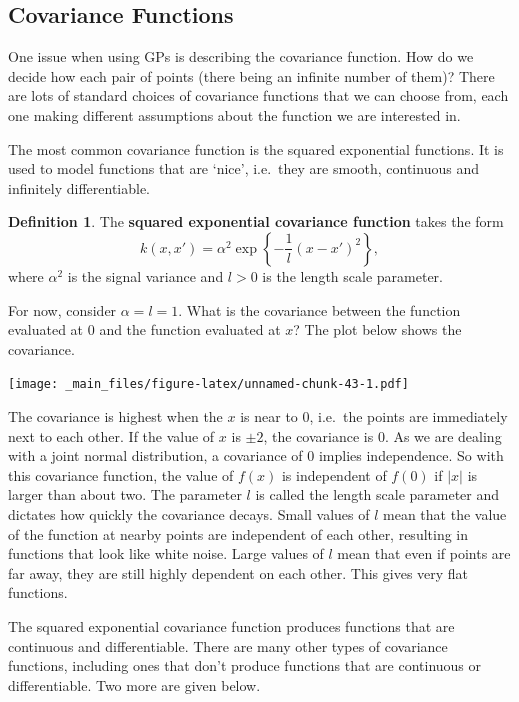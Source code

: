 \documentclass[
]{book}
\theoremstyle{definition}
\newtheorem{definition}{Definition}[chapter]
\theoremstyle{definition}
\theoremstyle{definition}
\theoremstyle{definition}
\theoremstyle{remark}
\begin{document}
\hypertarget{covariance-functions}{%
\subsection{Covariance Functions}\label{covariance-functions}}

One issue when using GPs is describing the covariance function. How do we decide how each pair of points (there being an infinite number of them)? There are lots of standard choices of covariance functions that we can choose from, each one making different assumptions about the function we are interested in.

The most common covariance function is the squared exponential functions. It is used to model functions that are `nice', i.e.~they are smooth, continuous and infinitely differentiable.

\begin{definition}
The \textbf{squared exponential covariance function} takes the form
\[
k(x, x') = \alpha^2\exp\left\{-\frac{1}{l}(x-x')^2\right\},
\]
where \(\alpha^2\) is the signal variance and \(l>0\) is the length scale parameter.
\end{definition}

For now, consider \(\alpha = l = 1\). What is the covariance between the function evaluated at 0 and the function evaluated at \(x\)? The plot below shows the covariance.

\texttt{[image: \_main\_files/figure-latex/unnamed-chunk-43-1.pdf]}

The covariance is highest when the \(x\) is near to 0, i.e.~the points are immediately next to each other. If the value of \(x\) is \(\pm 2\), the covariance is 0. As we are dealing with a joint normal distribution, a covariance of 0 implies independence. So with this covariance function, the value of \(f(x)\) is independent of \(f(0)\) if \(|x|\) is larger than about two. The parameter \(l\) is called the length scale parameter and dictates how quickly the covariance decays. Small values of \(l\) mean that the value of the function at nearby points are independent of each other, resulting in functions that look like white noise. Large values of \(l\) mean that even if points are far away, they are still highly dependent on each other. This gives very flat functions.

The squared exponential covariance function produces functions that are continuous and differentiable. There are many other types of covariance functions, including ones that don't produce functions that are continuous or differentiable. Two more are given below.
\end{document}
